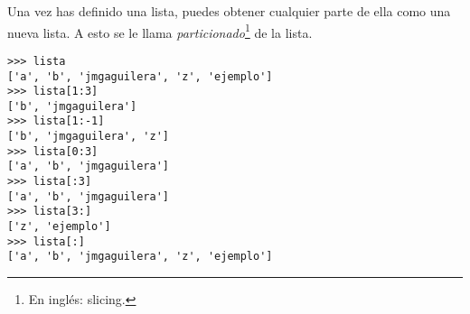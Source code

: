 
Una vez has definido una lista, puedes obtener cualquier parte de ella como una nueva lista. A esto se le llama \emph{particionado}\footnote{En inglés: slicing.} de la lista.

\noindent\begin{minipage}{\textwidth}
\begin{lstlisting}[mathescape=True]
>>> lista
['a', 'b', 'jmgaguilera', 'z', 'ejemplo']
>>> lista[1:3]
['b', 'jmgaguilera']
>>> lista[1:-1]
['b', 'jmgaguilera', 'z']
>>> lista[0:3]
['a', 'b', 'jmgaguilera']
>>> lista[:3]
['a', 'b', 'jmgaguilera']
>>> lista[3:]
['z', 'ejemplo']
>>> lista[:]
['a', 'b', 'jmgaguilera', 'z', 'ejemplo']
\end{lstlisting}
\end{minipage}

